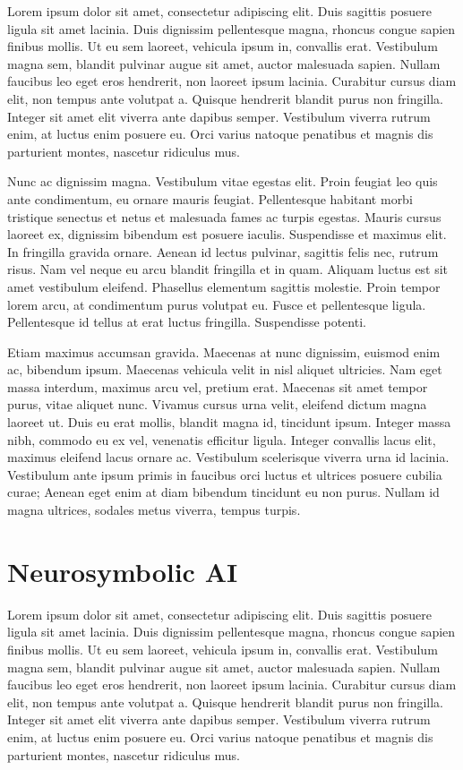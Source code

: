 \documentclass[
  a4paper,
  DIV=11,
  numbers=noendperiod]{scrreprt}
\begin{document}
Lorem ipsum dolor sit amet, consectetur adipiscing elit. Duis sagittis
posuere ligula sit amet lacinia. Duis dignissim pellentesque magna,
rhoncus congue sapien finibus mollis. Ut eu sem laoreet, vehicula ipsum
in, convallis erat. Vestibulum magna sem, blandit pulvinar augue sit
amet, auctor malesuada sapien. Nullam faucibus leo eget eros hendrerit,
non laoreet ipsum lacinia. Curabitur cursus diam elit, non tempus ante
volutpat a. Quisque hendrerit blandit purus non fringilla. Integer sit
amet elit viverra ante dapibus semper. Vestibulum viverra rutrum enim,
at luctus enim posuere eu. Orci varius natoque penatibus et magnis dis
parturient montes, nascetur ridiculus mus.

Nunc ac dignissim magna. Vestibulum vitae egestas elit. Proin feugiat
leo quis ante condimentum, eu ornare mauris feugiat. Pellentesque
habitant morbi tristique senectus et netus et malesuada fames ac turpis
egestas. Mauris cursus laoreet ex, dignissim bibendum est posuere
iaculis. Suspendisse et maximus elit. In fringilla gravida ornare.
Aenean id lectus pulvinar, sagittis felis nec, rutrum risus. Nam vel
neque eu arcu blandit fringilla et in quam. Aliquam luctus est sit amet
vestibulum eleifend. Phasellus elementum sagittis molestie. Proin tempor
lorem arcu, at condimentum purus volutpat eu. Fusce et pellentesque
ligula. Pellentesque id tellus at erat luctus fringilla. Suspendisse
potenti.

Etiam maximus accumsan gravida. Maecenas at nunc dignissim, euismod enim
ac, bibendum ipsum. Maecenas vehicula velit in nisl aliquet ultricies.
Nam eget massa interdum, maximus arcu vel, pretium erat. Maecenas sit
amet tempor purus, vitae aliquet nunc. Vivamus cursus urna velit,
eleifend dictum magna laoreet ut. Duis eu erat mollis, blandit magna id,
tincidunt ipsum. Integer massa nibh, commodo eu ex vel, venenatis
efficitur ligula. Integer convallis lacus elit, maximus eleifend lacus
ornare ac. Vestibulum scelerisque viverra urna id lacinia. Vestibulum
ante ipsum primis in faucibus orci luctus et ultrices posuere cubilia
curae; Aenean eget enim at diam bibendum tincidunt eu non purus. Nullam
id magna ultrices, sodales metus viverra, tempus turpis.

\section{Neurosymbolic AI}\label{neurosymbolic-ai}

Lorem ipsum dolor sit amet, consectetur adipiscing elit. Duis sagittis
posuere ligula sit amet lacinia. Duis dignissim pellentesque magna,
rhoncus congue sapien finibus mollis. Ut eu sem laoreet, vehicula ipsum
in, convallis erat. Vestibulum magna sem, blandit pulvinar augue sit
amet, auctor malesuada sapien. Nullam faucibus leo eget eros hendrerit,
non laoreet ipsum lacinia. Curabitur cursus diam elit, non tempus ante
volutpat a. Quisque hendrerit blandit purus non fringilla. Integer sit
amet elit viverra ante dapibus semper. Vestibulum viverra rutrum enim,
at luctus enim posuere eu. Orci varius natoque penatibus et magnis dis
parturient montes, nascetur ridiculus mus.
\end{document}
